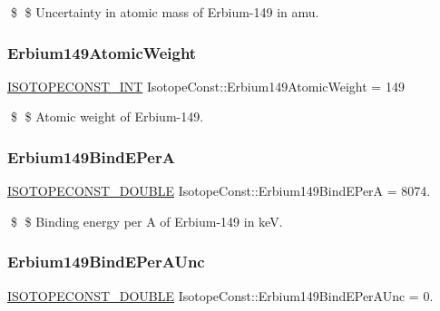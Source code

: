\$ \$ Uncertainty in atomic mass of Erbium-\/149 in amu. \mbox{\label{group___isotope_const-_erbium-_er149_ga060c70c674c724630a8c399fe359dd7b}} 
\subsubsection{\texorpdfstring{Erbium149\+Atomic\+Weight}{Erbium149AtomicWeight}}
{\footnotesize\ttfamily \mbox{\hyperlink{group___isotope_const-_macros_ga5f18360b3e99483a35c32d789e62621c}{I\+S\+O\+T\+O\+P\+E\+C\+O\+N\+S\+T\+\_\+\+I\+NT}} Isotope\+Const\+::\+Erbium149\+Atomic\+Weight = 149}

\$ \$ Atomic weight of Erbium-\/149. \mbox{\label{group___isotope_const-_erbium-_er149_ga1fefa6b985279e5869ac325d0dc29f41}} 
\subsubsection{\texorpdfstring{Erbium149\+Bind\+E\+PerA}{Erbium149BindEPerA}}
{\footnotesize\ttfamily \mbox{\hyperlink{group___isotope_const-_macros_ga8f45a7272ce02c0b4c65c44636ed719a}{I\+S\+O\+T\+O\+P\+E\+C\+O\+N\+S\+T\+\_\+\+D\+O\+U\+B\+LE}} Isotope\+Const\+::\+Erbium149\+Bind\+E\+PerA = 8074.}

\$ \$ Binding energy per A of Erbium-\/149 in keV. \mbox{\label{group___isotope_const-_erbium-_er149_ga36d91b2316e9cabc126aec959bbd4cb8}} 
\subsubsection{\texorpdfstring{Erbium149\+Bind\+E\+Per\+A\+Unc}{Erbium149BindEPerAUnc}}
{\footnotesize\ttfamily \mbox{\hyperlink{group___isotope_const-_macros_ga8f45a7272ce02c0b4c65c44636ed719a}{I\+S\+O\+T\+O\+P\+E\+C\+O\+N\+S\+T\+\_\+\+D\+O\+U\+B\+LE}} Isotope\+Const\+::\+Erbium149\+Bind\+E\+Per\+A\+Unc = 0.}

